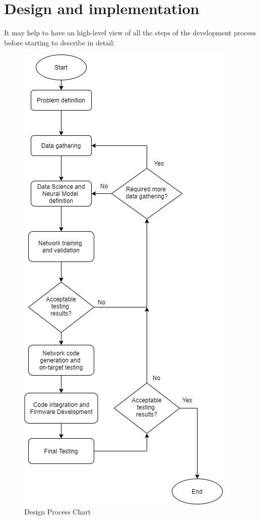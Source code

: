 \section{Design and implementation}
It may help to have an high-level view of all the steps of the development process before starting to describe in detail:\\
\begin{figure}
	\begin{center}
		\includegraphics[scale=0.6]{figures/design_steps.png}
		\caption{Design Process Chart}
	\end{center}
\centering
\vspace{-90pt}
\end{figure}
